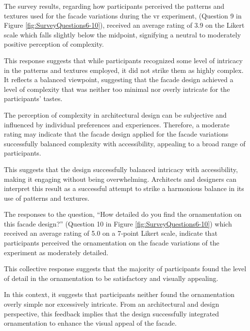 
The survey results, regarding how participants perceived the patterns and textures used for the facade variations during the vr experiment, (Question 9 in Figure \ref{fig:SurveyQuestions6-10}), received an average rating of 3.9 on the Likert scale which falls slightly below the midpoint, signifying a neutral to moderately positive perception of complexity.

This response suggests that while participants recognized some level of intricacy in the patterns and textures employed, it did not strike them as highly complex.
It reflects a balanced viewpoint, suggesting that the facade design achieved a level of complexity that was neither too minimal nor overly intricate for the participants' tastes.

The perception of complexity in architectural design can be subjective and influenced by individual preferences and experiences.
Therefore, a moderate rating may indicate that the facade design applied for the facade variations successfully balanced complexity with accessibility, appealing to a broad range of participants.

This suggests that the design successfully balanced intricacy with accessibility, making it engaging without being overwhelming.
Architects and designers can interpret this result as a successful attempt to strike a harmonious balance in its use of patterns and textures.


The responses to the question, ``How detailed do you find the ornamentation on this facade design?'' (Question 10 in Figure \ref{fig:SurveyQuestions6-10}) which received an average rating of 5.0 on a 7-point Likert scale, indicate that participants perceived the ornamentation on the facade variations of the experiment as moderately detailed.

This  collective response suggests that the majority of participants found the level of detail in the ornamentation to be satisfactory and visually appealing.

 In this context, it suggests that participants neither found the ornamentation overly simple nor excessively intricate.
From an architectural and design perspective, this feedback implies that the design successfully integrated ornamentation to enhance the visual appeal of the facade.

